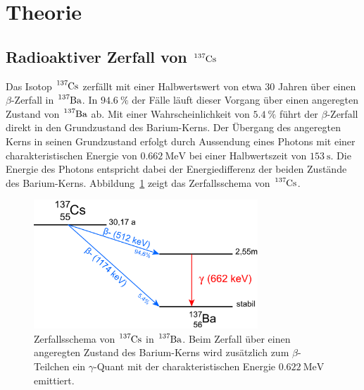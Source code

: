 \section{Theorie}
\label{sec:theorie}

\subsection{Radioaktiver Zerfall von $\ce{^{137}Cs}$}
Das Isotop $\ce{^{137}Cs}$ zerfällt mit einer Halbwertswert von etwa $30$ Jahren
über einen $\beta$-Zerfall in $\ce{^{137}Ba}$. In $\SI{94.6}{\percent}$ der
Fälle läuft dieser Vorgang über einen angeregten Zustand von $\ce{^{137}Ba}$ ab.
Mit einer Wahrscheinlichkeit von $\SI{5.4}{\percent}$ führt der $\beta$-Zerfall
direkt in den Grundzustand des Barium-Kerns. Der Übergang des angeregten Kerns
in seinen Grundzustand erfolgt durch Aussendung eines Photons mit einer
charakteristischen Energie von $\SI{0.662}{\mega\electronvolt}$ bei einer
Halbwertszeit von $\SI{153}{\second}$. Die Energie des Photons entspricht dabei
der Energiedifferenz der beiden Zustände des Barium-Kerns.
Abbildung~\ref{fig:zerfallsschema} zeigt das Zerfallsschema von $\ce{^{137}Cs}$.

\begin{figure}
  \centering
  \includegraphics[width=0.75\textwidth]{figures/Cs137_Zerfallsschema.png}
  \caption{Zerfallsschema von $\ce{^{137}Cs}$ in $\ce{^{137}Ba}$. Beim Zerfall
  über einen angeregten Zustand des Barium-Kerns wird zusätzlich zum
  $\beta$-Teilchen ein $\gamma$-Quant mit der charakteristischen Energie
  $\SI{0.622}{\mega\electronvolt}$ emittiert.}
  \label{fig:zerfallsschema}
\end{figure}

